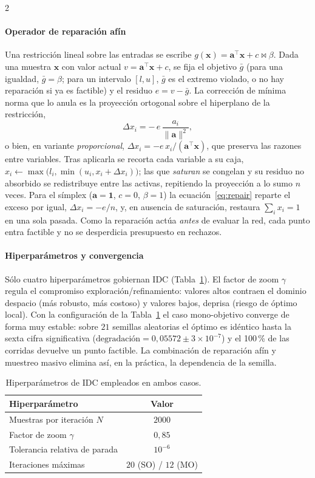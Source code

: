 \documentclass[5p,times,authoryear]{sciarticle}
\begin{document}
\begin{multicols}{2}
\paragraph{Operador de reparación afín} Una restricción lineal sobre las
entradas se escribe $g(\bm{x})=\bm{a}^\top\bm{x}+c\bowtie\beta$. Dada una
muestra $\bm{x}$ con valor actual $v=\bm{a}^\top\bm{x}+c$, se fija el objetivo
$\bar{g}$ (para una igualdad, $\bar{g}=\beta$; para un intervalo $[l,u]$,
$\bar{g}$ es el extremo violado, o no hay reparación si ya es factible) y el
residuo $e=v-\bar{g}$. La corrección de mínima norma que lo anula es la
proyección ortogonal sobre el hiperplano de la restricción,
\begin{equation}
  \Delta x_i = -\,e\,\frac{a_i}{\lVert\bm{a}\rVert^2},
  \label{eq:repair}
\end{equation}
o bien, en variante \emph{proporcional}, $\Delta x_i=-e\,x_i/(\bm{a}^\top\bm{x})$,
que preserva las razones entre variables. Tras aplicarla se recorta cada
variable a su caja, $x_i\!\leftarrow\!\max\!\bigl(l_i,\min(u_i,x_i+\Delta x_i)\bigr)$;
las que \emph{saturan} se congelan y su residuo no absorbido se redistribuye
entre las activas, repitiendo la proyección a lo sumo $n$ veces. Para el
símplex ($\bm{a}=\bm{1}$, $c=0$, $\beta=1$) la ecuación~\eqref{eq:repair}
reparte el exceso por igual, $\Delta x_i=-e/n$, y, en ausencia de saturación,
restaura $\sum_i x_i=1$ en una sola pasada. Como la reparación actúa
\emph{antes} de evaluar la red, cada punto entra factible y no se desperdicia
presupuesto en rechazos.

\paragraph{Hiperparámetros y convergencia} Sólo cuatro hiperparámetros
gobiernan IDC (Tabla~\ref{tab:hp}). El factor de zoom $\gamma$ regula el
compromiso exploración/refinamiento: valores altos contraen el dominio
despacio (más robusto, más costoso) y valores bajos, deprisa (riesgo de
óptimo local). Con la configuración de la Tabla~\ref{tab:hp} el caso
mono-objetivo converge de forma muy estable: sobre $21$ semillas aleatorias el
óptimo es idéntico hasta la sexta cifra significativa
($\text{degradación}=0{,}05572\pm 3\!\times\!10^{-7}$) y el 100\,\% de las
corridas devuelve un punto factible. La combinación de reparación afín y
muestreo masivo elimina así, en la práctica, la dependencia de la semilla.

\begin{table}[H]
\centering
\caption{Hiperparámetros de IDC empleados en ambos casos.}
\label{tab:hp}
\begin{tabular}{l c}
\hline
Hiperparámetro & Valor \\
\hline
Muestras por iteración $N$        & $2000$ \\
Factor de zoom $\gamma$           & $0{,}85$ \\
Tolerancia relativa de parada     & $10^{-6}$ \\
Iteraciones máximas               & $20$ (SO) / $12$ (MO) \\
\hline
\end{tabular}
\end{table}


\end{multicols}
\end{document}
